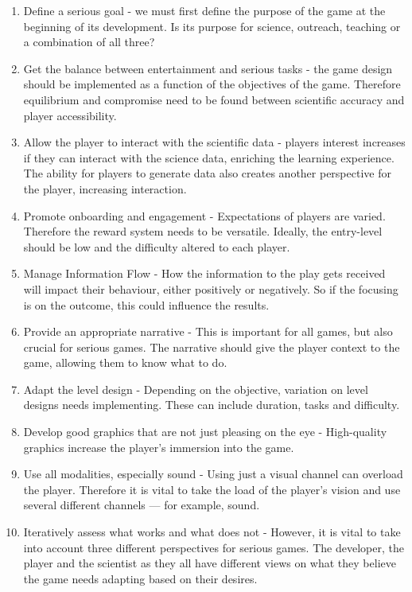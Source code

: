 	\begin{enumerate}		
		\item Define a serious goal - we must first define the purpose of the game at the beginning of its development. Is its purpose for science, outreach, teaching or a combination of all three? 
		
		\item Get the balance between entertainment and serious tasks - the game design should be implemented as a function of the objectives of the game. Therefore equilibrium and compromise need to be found between scientific accuracy and player accessibility.
		
		\item Allow the player to interact with the scientific data - players interest increases if they can interact with the science data, enriching the learning experience. The ability for players to generate data also creates another perspective for the player, increasing interaction.
		
		\item Promote onboarding and engagement - Expectations of players are varied. Therefore the reward system needs to be versatile. Ideally, the entry-level should be low and the difficulty altered to each player.
		
		\item Manage Information Flow - How the information to the play gets received will impact their behaviour, either positively or negatively. So if the focusing is on the outcome, this could influence the results.
		
		\item Provide an appropriate narrative - This is important for all games, but also crucial for serious games. The narrative should give the player context to the game, allowing them to know what to do.
		
		\item Adapt the level design - Depending on the objective, variation on level designs needs implementing. These can include duration, tasks and difficulty. 
		
		\item Develop good graphics that are not just pleasing on the eye - High-quality graphics increase the player's immersion into the game.
		
		\item Use all modalities, especially sound - Using just a visual channel can overload the player. Therefore it is vital to take the load of the player's vision and use several different channels — for example, sound.
		
		\item Iteratively assess what works and what does not - However, it is vital to take into account three different perspectives for serious games. The developer, the player and the scientist as they all have different views on what they believe the game needs adapting based on their desires.
	\end{enumerate} %
	
